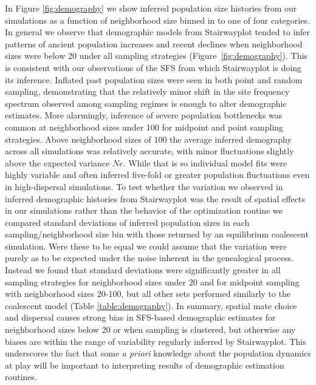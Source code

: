 \documentclass[11pt,twoside,lineno]{preprint}
\begin{document}
In Figure \ref{fig:demography} we show inferred population size histories from our simulations as a function of neighborhood size binned in to one of four categories. In general we observe that demographic models from Stairwayplot tended to infer patterns of ancient population increases and recent declines when neighborhood sizes were below 20 under all sampling strategies (Figure~\ref{fig:demography}). This is consistent with our observations of the SFS from which Stairwayplot is doing its inference. Inflated past population sizes were seen in both point and random sampling, demonstrating that the relatively minor shift in the site frequency spectrum observed among sampling regimes is enough to alter demographic estimates. More alarmingly, inference of severe population bottlenecks was  common at neighborhood sizes under 100 for midpoint and point sampling strategies. Above neighborhood sizes of 100 the average inferred demography across all simulations was relatively accurate, with minor fluctuations slightly above the expected variance $Ne$. While that is so individual model fits were highly variable and often inferred five-fold or greater population fluctuations even in high-dispersal simulations.  
To test whether the variation we observed in inferred demographic histories from Stairwayplot was the result of spatial effects in our simulations rather than the behavior of the optimization routine we compared standard deviations of inferred population sizes in each sampling/neighborhood size bin with those returned by an equilibrium coalescent simulation. Were these to be equal we could assume that the variation were purely as to be expected under the noise inherent in the genealogical process. Instead we found that standard deviations were significantly greater in all sampling strategies for neighborhood sizes under 20 and for midpoint sampling with neighborhood sizes 20-100, but all other sets performed similarly to the coalescent model (Table \ref{table:demography}). In summary, spatial mate choice and dispersal causes strong bias in SFS-based demographic estimates for neighborhood sizes below 20 or when sampling is clustered, but otherwise any biases are within the range of variability regularly inferred by Stairwayplot. This underscores the fact that some \textit{a priori} knowledge about the population dynamics at play will be important to interpreting results of demographic estimation routines. 
\end{document}
